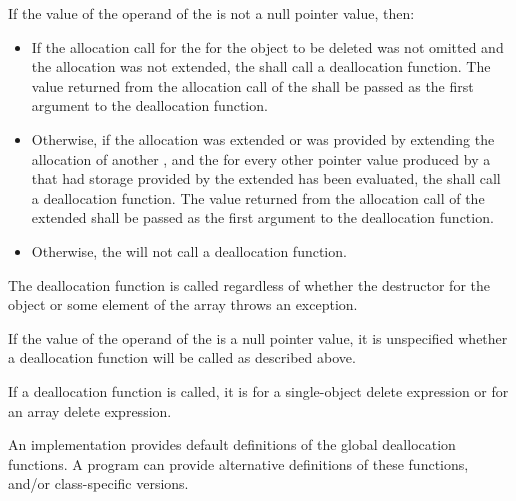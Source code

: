 \pnum
If the value of the operand of the  is not a
null pointer value, then:

\begin{itemize}
\item
If the allocation call for the  for the object to
be deleted was not omitted and the allocation was not extended, the
 shall call a deallocation
function. The value returned from the
allocation call of the  shall be passed as the
first argument to the deallocation function.

\item
Otherwise, if the allocation was extended or was provided by extending the
allocation of another , and the
 for every other pointer value produced by a
 that had storage provided by the extended
 has been evaluated, the
 shall call a deallocation function. The value
returned from the allocation call of the extended 
shall be passed as the first argument to the deallocation function.

\item
Otherwise, the  will not call a
deallocation function.
\end{itemize}
\begin{note}
The deallocation function is called regardless of whether the destructor
for the object or some element of the array throws an exception.
\end{note}
If the value of the operand of the  is a
null pointer value, it is unspecified whether a deallocation function will be
called as described above.

\pnum
If a deallocation function is called,
it is  for a single-object delete expression or
 for an array delete expression.
\begin{note}
%
An implementation provides default definitions of the global
deallocation functions.
A \Cpp{} program can provide alternative definitions of these
functions, and/or class-specific
versions.
\end{note}

